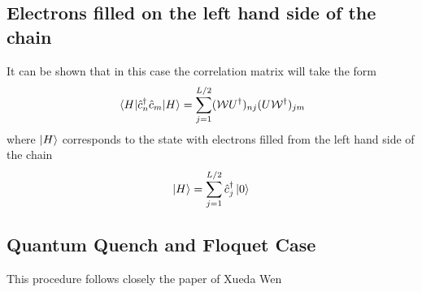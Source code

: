 \documentclass[11pt, a4paper]{article}
\theoremstyle{definition} %
\begin{document}
	 
	\subsection{Electrons filled on the left hand side of the chain}
	
	It can be shown that in this case the correlation matrix will take the form
	\begin{equation}
		\mel{H}{\hat{c}_n^\dagger \hat{c}_m}{H} = \sum_{j=1}^{L/2} (\mathcal{W} U^\dagger)_{nj} (U\mathcal{W}^\dagger)_{jm}
	\end{equation}
	where $\ket{H}$ corresponds to the state with electrons filled from the left hand side of the chain
	\begin{equation}
		\ket{H} = \sum_{j=1}^{L/2} \hat{c}_j^\dagger \ket{0}
	\end{equation}
	

	\subsection{Quantum Quench and Floquet Case}
	This procedure follows closely the paper of Xueda Wen \cite{Xueda} \\
	
\end{document}
